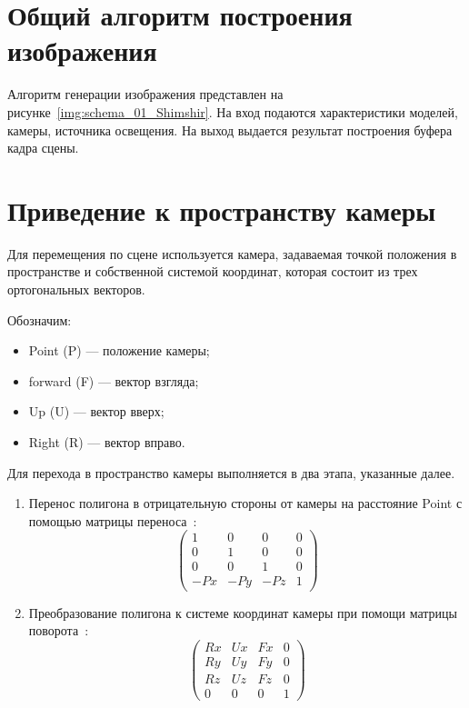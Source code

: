 \section{Общий алгоритм построения изображения}

Алгоритм генерации изображения представлен на рисунке~\ref{img:schema_01_Shimshir}.
На вход подаются характеристики моделей, камеры, источника освещения.
На выход выдается результат построения буфера кадра сцены.

\newpage

\section{Приведение к пространству камеры}

Для перемещения по сцене используется камера, задаваемая точкой положения в пространстве и собственной системой координат, которая состоит из трех ортогональных векторов.

Обозначим:
\begin{itemize}
	\item Point (P) --- положение камеры;
	\item forward (F) --- вектор взгляда;
	\item Up (U) --- вектор вверх;
	\item Right (R) --- вектор вправо.
\end{itemize}

Для перехода в пространство камеры выполняется в два этапа, указанные далее.
\begin{enumerate}
	\item Перенос полигона в отрицательную стороны от камеры на расстояние Point с помощью матрицы переноса~\cite{palcing-camera}:
	\begin{equation}
		\begin{pmatrix}
			1  & 0  & 0  & 0 \\
			0  & 1  & 0  & 0 \\
			0  & 0  & 1  & 0 \\
			-Px & -Py & -Pz & 1
		\end{pmatrix}
	\end{equation}
	\item Преобразование полигона к системе координат камеры при помощи матрицы поворота~\cite{palcing-camera}:
	\begin{equation}
		\begin{pmatrix}
			Rx  & Ux  & Fx  & 0 \\
			Ry  & Uy  & Fy  & 0 \\
			Rz  & Uz  & Fz  & 0 \\
			0   & 0   & 0   & 1
		\end{pmatrix}
	\end{equation}
\end{enumerate}

